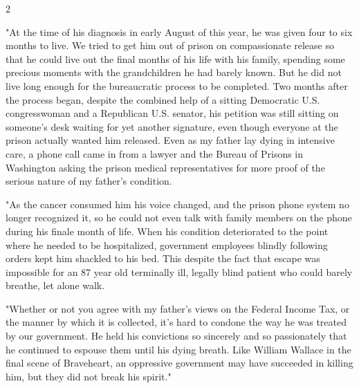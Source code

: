 \documentclass[10pt,a4paper,twoside]{article} %
\begin{document}
\begin{multicols}{2}
{\newline \indent "At the time of his diagnosis in early August of this year, he was given four to six months to live. We tried to get him out of prison on compassionate release so that he could live out the final months of his life with his family, spending some precious moments with the grandchildren he had barely known. But he did not live long enough for the bureaucratic process to be completed. Two months after the process began, despite the combined help of a sitting Democratic U.S. congresswoman and a Republican U.S. senator, his petition was still sitting on someone’s desk waiting for yet another signature, even though everyone at the prison actually wanted him released. Even as my father lay dying in intensive care, a phone call came in from a lawyer and the Bureau of Prisons in Washington asking the prison medical representatives for more proof of the serious nature of my father’s condition.

\newline \indent "As the cancer consumed him his voice changed, and the prison phone system no longer recognized it, so he could not even talk with family members on the phone during his finale month of life. When his condition deteriorated to the point where he needed to be hospitalized, government employees blindly following orders kept him shackled to his bed. This despite the fact that escape was impossible for an 87 year old terminally ill, legally blind patient who could barely breathe, let alone walk.

\newline \indent "Whether or not you agree with my father’s views on the Federal Income Tax, or the manner by which it is collected, it’s hard to condone the way he was treated by our government. He held his convictions so sincerely and so passionately that he continued to espouse them until his dying breath. Like William Wallace in the final scene of Braveheart, an oppressive government may have succeeded in killing him, but they did not break his spirit."

}




\end{multicols}
\end{document}
